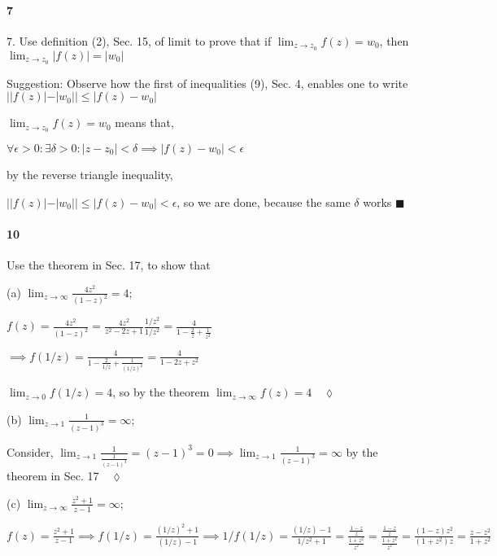 \documentclass{article}
\begin{document}
\paragraph{7} 7. Use definition (2), Sec. 15, of limit to prove that
if $\lim_{z\rightarrow z_0} f(z) = w_0$, then $\lim_{z\rightarrow z_0}
|f(z)| = |w_0|$

Suggestion: Observe how the first of inequalities (9), Sec. 4, enables
one to write
$||f(z)| -|w_0||\leq |f(z)-w_0|$


$\lim_{z\rightarrow z_0} f(z) = w_0$ means that,

$\forall \epsilon>0:\exists \delta >0:  |z-z_0|< \delta \implies
|f(z)-w_0|<\epsilon$

by the reverse triangle inequality,

$||f(z)| -|w_0||\leq |f(z)-w_0| <\epsilon$, so we are done, because
the same $\delta$ works
$\blacksquare$

\paragraph{10}  Use the theorem in Sec. 17, to show that

(a) $\lim_{z\rightarrow \infty} \frac{4z^2}{(1-z)^2} = 4$;


$f(z) = \frac{4z^2}{(1-z)^2} =\frac{4z^2}{z^2 -2z +1}\frac{1/z^2}{1/z^2} =
\frac{4}{1 -\frac{2}{z} +\frac{1}{z^2}}$

$\implies f(1/z) = \frac{4}{1 -\frac{2}{1/z} +\frac{1}{(1/z)^2}} =
\frac{4}{1 -2z +z^2}$

$\lim_{z\rightarrow 0} f(1/z) = 4$, so by the theorem
$\lim_{z\rightarrow \infty} f(z) = 4\quad \lozenge$

(b) $\lim_{z\rightarrow 1} \frac{1}{(z-1)^3} = \infty;$


Consider, $\lim_{z\rightarrow 1} \frac{1}{\frac{1}{(z-1)^3}} = (z-1)^3
= 0 \implies \lim_{z\rightarrow 1} \frac{1}{(z-1)^3} = \infty$ by the
theorem in Sec. 17$\quad \lozenge$

(c) $\lim_{z\rightarrow \infty} \frac{z^2+1}{z-1} = \infty;$

$f(z)= \frac{z^2+1}{z-1} \implies f(1/z) = \frac{(1/z)^2+1}{(1/z) -1}
\implies 1/f(1/z) = \frac{(1/z) -1}{1/z^2 +1} =
\frac{\frac{1-z}{z}}{\frac{1+z^2}{z^2}} =
\frac{\frac{1-z}{z}}{\frac{1+z^2}{z^2}} = \frac{(1-z)z^2}{(1+z^2)z} =
\frac{z-z^2}{1+z^2}$
\end{document}
